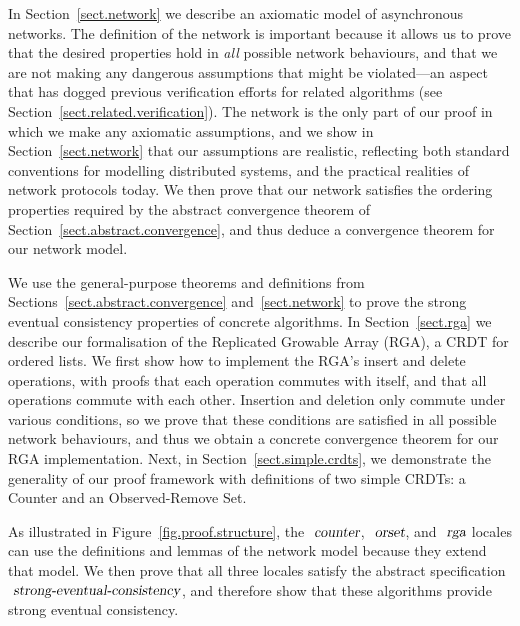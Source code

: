 In Section~\ref{sect.network} we describe an axiomatic model of asynchronous networks.
The definition of the network is important because it allows us to prove that the desired properties hold in \emph{all} possible network behaviours, and that we are not making any dangerous assumptions that might be violated---an aspect that has dogged previous verification efforts for related algorithms (see Section~\ref{sect.related.verification}).
The network is the only part of our proof in which we make any axiomatic assumptions, and we show in Section~\ref{sect.network} that our assumptions are realistic, reflecting both standard conventions for modelling distributed systems, and the practical realities of network protocols today.
We then prove that our network satisfies the ordering properties required by the abstract convergence theorem of Section~\ref{sect.abstract.convergence}, and thus deduce a convergence theorem for our network model.

We use the general-purpose theorems and definitions from Sections~\ref{sect.abstract.convergence} and~\ref{sect.network} to prove the strong eventual consistency properties of concrete algorithms.
In Section~\ref{sect.rga} we describe our formalisation of the Replicated Growable Array (RGA), a CRDT for ordered lists.
We first show how to implement the RGA's insert and delete operations, with proofs that each operation commutes with itself, and that all operations commute with each other.
Insertion and deletion only commute under various conditions, so we prove that these conditions are satisfied in all possible network behaviours, and thus we obtain a concrete convergence theorem for our RGA implementation.
Next, in Section~\ref{sect.simple.crdts}, we demonstrate the generality of our proof framework with definitions of two simple CRDTs: a Counter and an Observed-Remove Set.

As illustrated in Figure~\ref{fig.proof.structure}, the $\isa{counter}$, $\isa{orset}$, and $\isa{rga}$ locales can use the definitions and lemmas of the network model because they extend that model.
We then prove that all three locales satisfy the abstract specification $\isa{strong-eventual-consistency}$, and therefore show that these algorithms provide strong eventual consistency.
